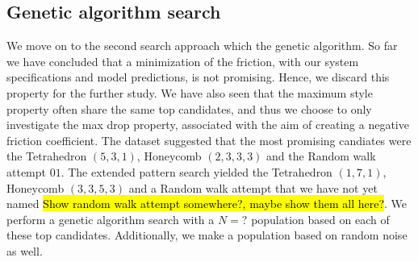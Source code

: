 \subsection{Genetic algorithm search}

We move on to the second search approach which the genetic algorithm. So far we have concluded that a minimization of the friction, with our system specifications and model predictions, is not promising. Hence, we discard this property for the further study. We have also seen that the maximum style property often share the same top candidates, and thus we choose to only investigate the max drop property, associated with the aim of creating a negative friction coefficient. The dataset suggested that the most promising candiates were the Tetrahedron $(5,3,1)$, Honeycomb $(2,3,3,3)$ and the Random walk attempt $01$. The extended pattern search yielded the Tetrahedron $(1,7,1)$, Honeycomb $(3,3,5,3)$ and a Random walk attempt that we have not yet named \hl{Show random walk attempt somewhere?, maybe show them all here?}. We perform a genetic algorithm search with a $N = ?$ population based on each of these top candidates. Additionally, we make a population based on random noise as well.  











